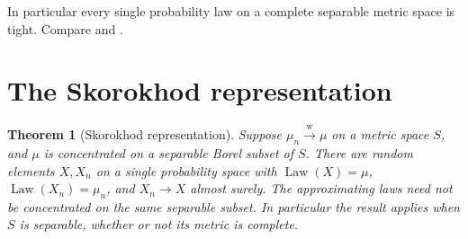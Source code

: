 \documentclass[11pt,oneside,openany]{book}
\DeclareMathOperator{\Law}{Law}
\newcommand{\weakto}{\xrightarrow{\mathrm{w}}}
\theoremstyle{plain}
\newtheorem{theorem}{Theorem}[chapter]
\theoremstyle{definition}
\theoremstyle{remark}
\begin{document}
In particular every single probability law on a complete separable
metric space is tight. Compare
\cite[Theorem 5.2, pp.~60--61]{Billingsley} and
\cite[Theorem 23.2, pp.~507--509]{Kallenberg}.

\section{The Skorokhod representation}
\label{p06-07}

\begin{theorem}[Skorokhod representation]
\label{thm:p06-skorokhod}
Suppose \(\mu_n\weakto\mu\) on a metric space \(S\), and \(\mu\)
is concentrated on a separable Borel subset of \(S\). There are
random elements \(X,X_n\) on a single probability space with
\(\Law(X)=\mu\), \(\Law(X_n)=\mu_n\), and \(X_n\to X\) almost surely.
The approximating laws need not be concentrated on the same
separable subset. In particular the result applies when \(S\)
is separable, whether or not its metric is complete.
\end{theorem}
\end{document}
